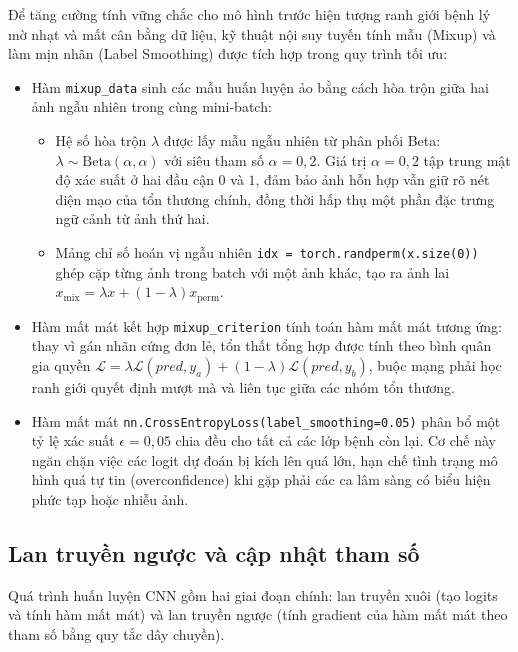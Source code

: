 Để tăng cường tính vững chắc cho mô hình trước hiện tượng ranh giới bệnh lý mờ nhạt và mất cân bằng dữ liệu, kỹ thuật nội suy tuyến tính mẫu (Mixup) và làm mịn nhãn (Label Smoothing) được tích hợp trong quy trình tối ưu:
\begin{itemize}
  \item Hàm \texttt{mixup\_data} sinh các mẫu huấn luyện ảo bằng cách hòa trộn giữa hai ảnh ngẫu nhiên trong cùng mini-batch:
  \begin{itemize}
    \item Hệ số hòa trộn $\lambda$ được lấy mẫu ngẫu nhiên từ phân phối Beta: $\lambda \sim \mathrm{Beta}(\alpha, \alpha)$ với siêu tham số $\alpha = 0{,}2$. Giá trị $\alpha = 0{,}2$ tập trung mật độ xác suất ở hai đầu cận $0$ và $1$, đảm bảo ảnh hỗn hợp vẫn giữ rõ nét diện mạo của tổn thương chính, đồng thời hấp thụ một phần đặc trưng ngữ cảnh từ ảnh thứ hai.
    \item Mảng chỉ số hoán vị ngẫu nhiên \texttt{idx = torch.randperm(x.size(0))} ghép cặp từng ảnh trong batch với một ảnh khác, tạo ra ảnh lai $x_{\mathrm{mix}} = \lambda x + (1-\lambda) x_{\mathrm{perm}}$.
  \end{itemize}
  \item Hàm mất mát kết hợp \texttt{mixup\_criterion} tính toán hàm mất mát tương ứng: thay vì gán nhãn cứng đơn lẻ, tổn thất tổng hợp được tính theo bình quân gia quyền $\mathcal{L} = \lambda \mathcal{L}(pred, y_a) + (1-\lambda) \mathcal{L}(pred, y_b)$, buộc mạng phải học ranh giới quyết định mượt mà và liên tục giữa các nhóm tổn thương.
  \item Hàm mất mát \texttt{nn.CrossEntropyLoss(label\_smoothing=0.05)} phân bổ một tỷ lệ xác suất $\epsilon = 0{,}05$ chia đều cho tất cả các lớp bệnh còn lại. Cơ chế này ngăn chặn việc các logit dự đoán bị kích lên quá lớn, hạn chế tình trạng mô hình quá tự tin (overconfidence) khi gặp phải các ca lâm sàng có biểu hiện phức tạp hoặc nhiễu ảnh.
\end{itemize}


\subsection{Lan truyền ngược và cập nhật tham số}

Quá trình huấn luyện CNN gồm hai giai đoạn chính: lan truyền xuôi (tạo logits và tính hàm mất mát) và lan truyền ngược (tính gradient của hàm mất mát theo tham số bằng quy tắc dây chuyền).

